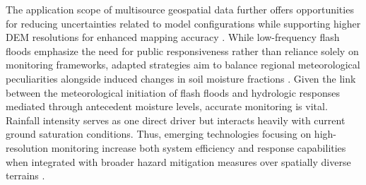 The application scope of multisource geospatial data further offers opportunities for reducing uncertainties related to model configurations while supporting higher DEM resolutions for enhanced mapping accuracy \citep{Pham2020}. While low-frequency flash floods emphasize the need for public responsiveness rather than reliance solely on monitoring frameworks, adapted strategies aim to balance regional meteorological peculiarities alongside induced changes in soil moisture fractions \citep{Zhang2024}.
Given the link between the meteorological initiation of flash floods and hydrologic responses mediated through antecedent moisture levels, accurate monitoring is vital. Rainfall intensity serves as one direct driver but interacts heavily with current ground saturation conditions. Thus, emerging technologies focusing on high-resolution monitoring increase both system efficiency and response capabilities when integrated with broader hazard mitigation measures over spatially diverse terrains \citep{Msigwa2024}.
